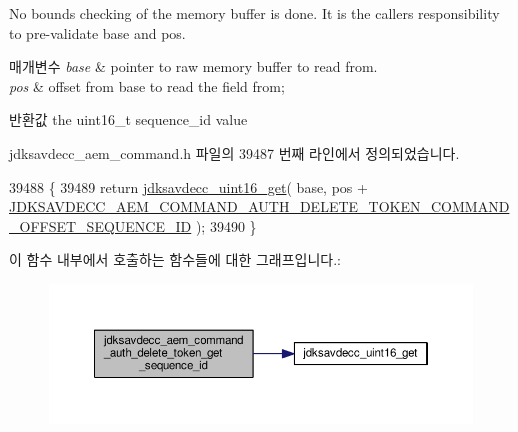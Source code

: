 No bounds checking of the memory buffer is done. It is the caller\textquotesingle{}s responsibility to pre-\/validate base and pos.


\begin{DoxyParams}{매개변수}
{\em base} & pointer to raw memory buffer to read from. \\
\hline
{\em pos} & offset from base to read the field from; \\
\hline
\end{DoxyParams}
\begin{DoxyReturn}{반환값}
the uint16\+\_\+t sequence\+\_\+id value 
\end{DoxyReturn}


jdksavdecc\+\_\+aem\+\_\+command.\+h 파일의 39487 번째 라인에서 정의되었습니다.


\begin{DoxyCode}
39488 \{
39489     \textcolor{keywordflow}{return} \hyperlink{group__endian_ga3fbbbc20be954aa61e039872965b0dc9}{jdksavdecc\_uint16\_get}( base, pos + 
      \hyperlink{group__command__auth__delete__token_gadbe52ca24509143f8d2ea63b4a6e94f9}{JDKSAVDECC\_AEM\_COMMAND\_AUTH\_DELETE\_TOKEN\_COMMAND\_OFFSET\_SEQUENCE\_ID}
       );
39490 \}
\end{DoxyCode}


이 함수 내부에서 호출하는 함수들에 대한 그래프입니다.\+:
\nopagebreak
\begin{figure}[H]
\begin{center}
\leavevmode
\includegraphics[width=350pt]{group__command__auth__delete__token_ga959b492b4c2d2635984bafd243fe43ff_cgraph}
\end{center}
\end{figure}


